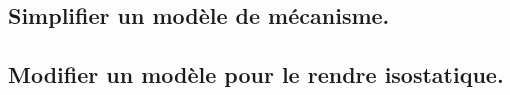 \documentclass[10pt,fleqn]{article}
\newcommand{\repRel}{../..}
\newcommand{\repStyle}{\repRel/Style}
\newcommand{\td}{fichier_td}
\newcommand{\repExos}{\repRel/ExercicesCompetences}
\newcommand{\repExo}{dossier}
\begin{document}
\subsection{Simplifier un modèle de mécanisme.} 

\begin{multicols}{2} 

\end{multicols}

\subsection{Modifier un modèle pour le rendre isostatique.} 

\begin{multicols}{2} 

\renewcommand{\repExo}{\repExos/B2_ProposerModele/B2_16_Hyperstatisme/64_EPAS}
\renewcommand{\td}{64_EPAS}
\graphicspath{{\repStyle/png/}{\repExo/images/}}


\renewcommand{\repExo}{\repExos/B2_ProposerModele/B2_16_Hyperstatisme/69_TrainA350}
\renewcommand{\td}{69_TrainA350}
\graphicspath{{\repStyle/png/}{\repExo/images/}}


\renewcommand{\repExo}{\repExos/B2_ProposerModele/B2_16_Hyperstatisme/71_Robovolc}
\renewcommand{\td}{71_Robovolc}
\graphicspath{{\repStyle/png/}{\repExo/images/}}


\renewcommand{\repExo}{\repExos/B2_ProposerModele/B2_16_Hyperstatisme/71_Robovolc_02}
\renewcommand{\td}{71_Robovolc_02}
\graphicspath{{\repStyle/png/}{\repExo/images/}}


\renewcommand{\repExo}{\repExos/B2_ProposerModele/B2_16_Hyperstatisme/72_Tripteor}
\renewcommand{\td}{72_Tripteor}
\graphicspath{{\repStyle/png/}{\repExo/images/}}


\renewcommand{\repExo}{\repExos/B2_ProposerModele/B2_16_Hyperstatisme/81_Piaggio}
\renewcommand{\td}{81_Piaggio}
\graphicspath{{\repStyle/png/}{\repExo/images/}}


\renewcommand{\repExo}{\repExos/B2_ProposerModele/B2_16_Hyperstatisme/82_MAV}
\renewcommand{\td}{82_MAV}
\graphicspath{{\repStyle/png/}{\repExo/images/}}


\renewcommand{\repExo}{\repExos/B2_ProposerModele/B2_16_Hyperstatisme/83_Roburoc}
\renewcommand{\td}{79_Roburoc}
\graphicspath{{\repStyle/png/}{\repExo/images/}}


\end{multicols}
\end{document}
